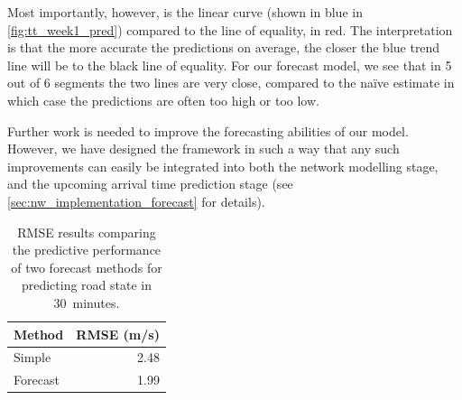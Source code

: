 Most importantly, however, is the linear curve (shown in blue in \cref{fig:tt_week1_pred}) compared to the line of equality, in red. The interpretation is that the more accurate the predictions on average, the closer the blue trend line will be to the black line of equality. For our forecast model, we see that in 5 out of 6 segments the two lines are very close, compared to the na\"ive estimate in which case the predictions are often too high or too low.


Further work is needed to improve the forecasting abilities of our model. However, we have designed the framework in such a way that any such improvements can easily be integrated into both the network modelling stage, and the upcoming arrival time prediction stage (see \cref{sec:nw_implementation_forecast} for details).

\begin{table}

\caption{\label{tab:tt_pred_rmse}RMSE results comparing the predictive performance of two forecast methods for predicting road state in 30~minutes.}
\centering
\begin{tabular}[t]{lr}
\toprule
Method & RMSE (m/s)\\
\midrule
Simple & 2.48\\
Forecast & 1.99\\
\bottomrule
\end{tabular}
\end{table}


